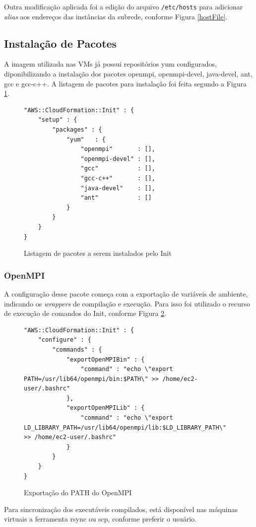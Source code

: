 \documentclass[tg]{mdtufsm}
\begin{document}
Outra modificação aplicada foi a edição do arquivo \verb|/etc/hosts| para adicionar \emph{alias} aos endereços das instâncias da subrede, conforme Figura \ref{hostFile}.


\subsection{Instalação de Pacotes}

A imagem utilizada nas VMs já possui repositórios yum configurados, diponibilizando a instalação dos pacotes openmpi, openmpi-devel, java-devel, ant, gcc e gcc-c++. A listagem de pacotes para instalação foi feita segundo a Figura \ref{pacotes}.

\begin{figure}
\centering
\begin{lstlisting}[frame=single, numbers=none]
"AWS::CloudFormation::Init" : {
	"setup" : {
		"packages" : {
			"yum"	: {
				"openmpi"		: [],
				"openmpi-devel"	: [],
				"gcc"			: [],
				"gcc-c++"		: [],
				"java-devel"	: [],
				"ant"			: []
			}
		}
	}
}
\end{lstlisting}
\caption{Listagem de pacotes a serem instalados pelo Init}
\label{pacotes}
\end{figure}

\subsubsection{OpenMPI}

A configuração desse pacote começa com a exportação de variáveis de ambiente, indicando os \emph{wrappers} de compilação e execução. Para isso foi utilizado o recurso de execução de comandos do Init, conforme Figura \ref{openMPI}.

\begin{figure}
\centering
\begin{lstlisting}[frame=single, numbers=none]
"AWS::CloudFormation::Init" : {
	"configure" : {
		"commands" : {
			"exportOpenMPIBin" : {
				"command" : "echo \"export PATH=/usr/lib64/openmpi/bin:$PATH\" >> /home/ec2-user/.bashrc"
			},
			"exportOpenMPILib" : {
				"command" : "echo \"export LD_LIBRARY_PATH=/usr/lib64/openmpi/lib:$LD_LIBRARY_PATH\" >> /home/ec2-user/.bashrc"
			}
		}
	}
}
\end{lstlisting}
\caption{Exportação do PATH do OpenMPI}
\label{openMPI}
\end{figure}

Para sincronização dos executáveis compilados, está disponível nas máquinas virtuais a ferramenta rsync ou scp, conforme preferir o usuário.
\end{document}
